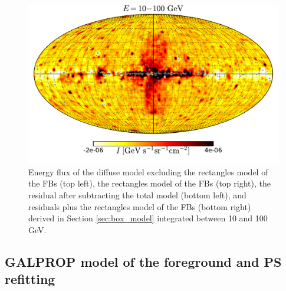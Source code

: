 \begin{figure}[h]
 \includegraphics[width=\twopic\textwidth]{plots/Mollweide_Boxes_residual+boxes_0p3-1p0GeV_flux_source_range_1.pdf}
 \caption{Energy flux of the diffuse model excluding the rectangles model of the FBs (top left),
 the rectangles model of the FBs (top right), 
the residual after subtracting the total model (bottom left),
and residuals plus the rectangles model of the FBs (bottom right)
 derived in Section \ref{sec:box_model}
 integrated between 10 and 100 GeV.}
 \label{fig:Maps_Rectangles}
\end{figure}

\subsection{GALPROP model of the foreground and PS refitting}
\label{sec:galprop_model}


